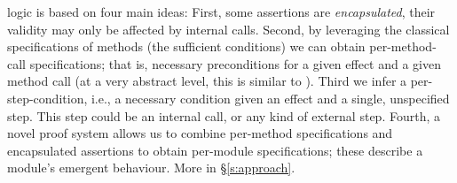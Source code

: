 \Nec logic is based on four main ideas: 
First, some assertions are \emph{encapsulated}, \ie
their validity may only be affected by internal calls. 
Second, by leveraging the classical  specifications of methods 
(\ie the sufficient conditions) we can obtain per-method-call
 \Nec specifications; that is, necessary preconditions
  for a given effect and a given method call (at a very abstract level, this is
similar to ).
Third we infer a per-step-condition, i.e., a necessary condition given an effect and a single, unspecified step. This step could be an internal call, or any kind of external step.
Fourth,  a novel proof system allows us to combine 
per-method \Nec specifications and encapsulated assertions 
 to obtain per-module   \Nec specifications; these describe a module's
 emergent behaviour.
More in \S\ref{s:approach}.
 
% 
% 
%
% 
% 



